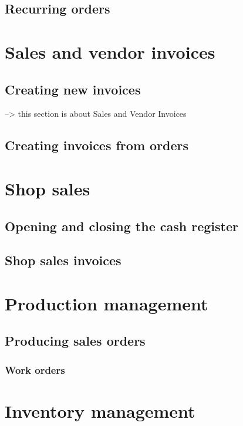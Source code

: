 \documentclass[10pt,A4]{book}
\begin{document}
\section{Recurring orders}


\chapter{Sales and vendor invoices}

\section{Creating new invoices}

--> this section is about Sales and Vendor Invoices

\section{Creating invoices from orders}

\chapter{Shop sales}

\section{Opening and closing the cash register}

\section{Shop sales invoices}

\chapter{Production management}

\section{Producing sales orders}

\subsection{Work orders}


\chapter{Inventory management}
\end{document}

